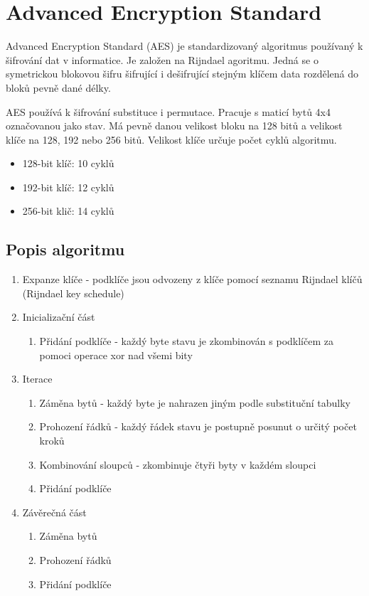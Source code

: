 \setlength{\parskip}{1em}

\chapter{Advanced Encryption Standard}

Advanced Encryption Standard (AES) je standardizovaný algoritmus používaný k šifrování dat v informatice. Je založen na Rijndael agoritmu. Jedná se o symetrickou blokovou šifru šifrující i dešifrující stejným klíčem data rozdělená do bloků pevně dané délky.

AES používá k šifrování substituce i permutace. Pracuje s maticí bytů 4x4 označovanou jako stav. Má pevně danou velikost bloku na 128 bitů a velikost klíče na 128, 192 nebo 256 bitů. Velikost klíče určuje počet cyklů algoritmu.

\begin{itemize}
	\item 128-bit klíč: 10 cyklů
	\item 192-bit klíč: 12 cyklů
	\item 256-bit klič: 14 cyklů
\end{itemize}


\section{Popis algoritmu}

\begin{enumerate}
	\item Expanze klíče - podklíče jsou odvozeny z klíče pomocí seznamu Rijndael klíčů (Rijndael key schedule)
	\item Inicializační část
	\begin{enumerate}
		\item Přidání podklíče - každý byte stavu je zkombinován s podklíčem za pomoci operace xor nad všemi bity
	\end{enumerate}
	\item Iterace
	\begin{enumerate}
		\item Záměna bytů - každý byte je nahrazen jiným podle substituční tabulky
		\item Prohození řádků - každý řádek stavu je postupně posunut o určitý počet kroků
		\item Kombinování sloupců - zkombinuje čtyři byty v každém sloupci
		\item Přidání podklíče
	\end{enumerate}
	\item Závěrečná část
	\begin{enumerate}
		\item Záměna bytů
		\item Prohození řádků
		\item Přidání podklíče
	\end{enumerate}
\end{enumerate}